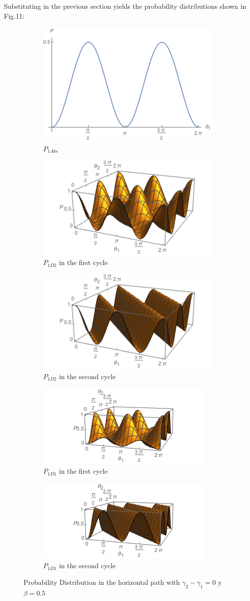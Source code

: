\documentclass[12pt]{book}
\begin{document}
Substituting in the previous section yields the probability distributions shown in Fig.11:
\begin{figure}[h]
\centering
\begin{subfigure}[b]{0.40\linewidth}
\includegraphics[width=\linewidth,height=3 cm]{images/p1cabs.png}
\caption{$P_{1Abs}$}
\label{fig:BS1}
\end{subfigure}
\begin{subfigure}[b]{0.40\linewidth}
\includegraphics[width=\linewidth,height=3 cm]{images/p1cd21.png}
\caption{$P_{1D2}$ in the first cycle }
\label{fig:BS1}
\end{subfigure}
\begin{subfigure}[b]{0.40\linewidth}
\includegraphics[width=\linewidth,height=3 cm]{images/p1cd22.png}
\caption{$P_{1D2}$ in the second cycle}
\label{fig:BS1}
\end{subfigure}
\begin{subfigure}[b]{0.40\linewidth}
\includegraphics[width=\linewidth,height=3 cm]{images/p1cd11.png}
\caption{$P_{1D1} $ in the first cycle}
\label{fig:westminster_aerea}
\end{subfigure}
\begin{subfigure}[b]{0.40\linewidth}
\includegraphics[width=\linewidth,height=3 cm]{images/p1cd12.png}
\caption{$P_{1D1} $ in the second cycle }
\label{fig:BS1}
\end{subfigure}
\caption{Probability Distribution in the horizontal path with  $\gamma_{2}-\gamma_{1}=0 $ y $\beta=0.5$}
\label{fig:westminster}
\end{figure}
\end{document}
